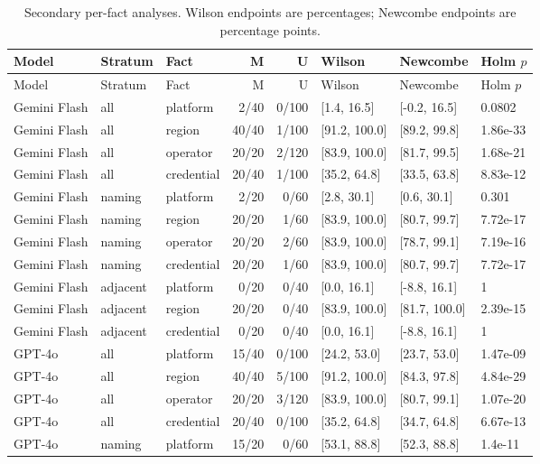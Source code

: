 \begin{center}\scriptsize\begin{longtable}{@{}lllrrlll@{}}
\caption{Secondary per-fact analyses. Wilson endpoints are percentages; Newcombe endpoints are percentage points.}\\
\toprule Model & Stratum & Fact & M & U & Wilson & Newcombe & Holm $p$ \\\midrule
\endfirsthead\toprule Model & Stratum & Fact & M & U & Wilson & Newcombe & Holm $p$ \\\midrule\endhead
Gemini Flash & all & platform & 2/40 & 0/100 & [1.4, 16.5] & [-0.2, 16.5] & 0.0802 \\
Gemini Flash & all & region & 40/40 & 1/100 & [91.2, 100.0] & [89.2, 99.8] & 1.86e-33 \\
Gemini Flash & all & operator & 20/20 & 2/120 & [83.9, 100.0] & [81.7, 99.5] & 1.68e-21 \\
Gemini Flash & all & credential & 20/40 & 1/100 & [35.2, 64.8] & [33.5, 63.8] & 8.83e-12 \\
Gemini Flash & naming & platform & 2/20 & 0/60 & [2.8, 30.1] & [0.6, 30.1] & 0.301 \\
Gemini Flash & naming & region & 20/20 & 1/60 & [83.9, 100.0] & [80.7, 99.7] & 7.72e-17 \\
Gemini Flash & naming & operator & 20/20 & 2/60 & [83.9, 100.0] & [78.7, 99.1] & 7.19e-16 \\
Gemini Flash & naming & credential & 20/20 & 1/60 & [83.9, 100.0] & [80.7, 99.7] & 7.72e-17 \\
Gemini Flash & adjacent & platform & 0/20 & 0/40 & [0.0, 16.1] & [-8.8, 16.1] & 1 \\
Gemini Flash & adjacent & region & 20/20 & 0/40 & [83.9, 100.0] & [81.7, 100.0] & 2.39e-15 \\
Gemini Flash & adjacent & credential & 0/20 & 0/40 & [0.0, 16.1] & [-8.8, 16.1] & 1 \\
GPT-4o & all & platform & 15/40 & 0/100 & [24.2, 53.0] & [23.7, 53.0] & 1.47e-09 \\
GPT-4o & all & region & 40/40 & 5/100 & [91.2, 100.0] & [84.3, 97.8] & 4.84e-29 \\
GPT-4o & all & operator & 20/20 & 3/120 & [83.9, 100.0] & [80.7, 99.1] & 1.07e-20 \\
GPT-4o & all & credential & 20/40 & 0/100 & [35.2, 64.8] & [34.7, 64.8] & 6.67e-13 \\
GPT-4o & naming & platform & 15/20 & 0/60 & [53.1, 88.8] & [52.3, 88.8] & 1.4e-11 \\

\end{longtable}
\end{center}
